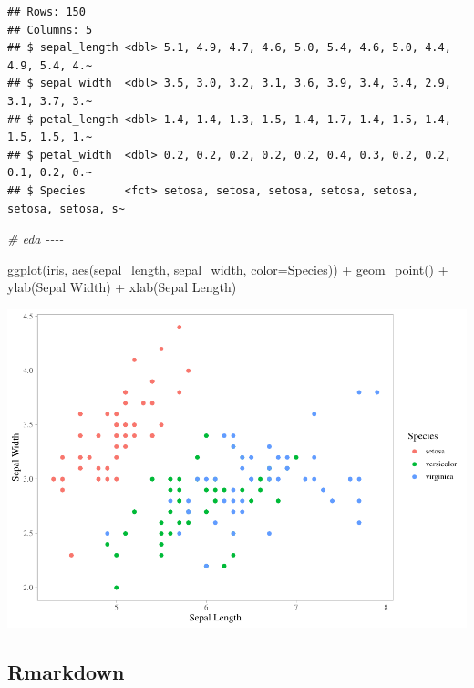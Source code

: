 \documentclass[
]{article}
\newenvironment{Shaded}{\begin{snugshade}}{\end{snugshade}}
\newcommand{\AttributeTok}[1]{\textcolor[rgb]{0.77,0.63,0.00}{#1}}
\newcommand{\CommentTok}[1]{\textcolor[rgb]{0.56,0.35,0.01}{\textit{#1}}}
\newcommand{\FunctionTok}[1]{\textcolor[rgb]{0.00,0.00,0.00}{#1}}
\newcommand{\NormalTok}[1]{#1}
\newcommand{\SpecialCharTok}[1]{\textcolor[rgb]{0.00,0.00,0.00}{#1}}
\newcommand{\StringTok}[1]{\textcolor[rgb]{0.31,0.60,0.02}{#1}}
\begin{document}
\begin{verbatim}
## Rows: 150
## Columns: 5
## $ sepal_length <dbl> 5.1, 4.9, 4.7, 4.6, 5.0, 5.4, 4.6, 5.0, 4.4, 4.9, 5.4, 4.~
## $ sepal_width  <dbl> 3.5, 3.0, 3.2, 3.1, 3.6, 3.9, 3.4, 3.4, 2.9, 3.1, 3.7, 3.~
## $ petal_length <dbl> 1.4, 1.4, 1.3, 1.5, 1.4, 1.7, 1.4, 1.5, 1.4, 1.5, 1.5, 1.~
## $ petal_width  <dbl> 0.2, 0.2, 0.2, 0.2, 0.2, 0.4, 0.3, 0.2, 0.2, 0.1, 0.2, 0.~
## $ Species      <fct> setosa, setosa, setosa, setosa, setosa, setosa, setosa, s~
\end{verbatim}

\begin{Shaded}
\begin{Highlighting}[]
\CommentTok{\# eda {-}{-}{-}{-}}

\FunctionTok{ggplot}\NormalTok{(iris, }\FunctionTok{aes}\NormalTok{(sepal\_length, sepal\_width, }\AttributeTok{color=}\NormalTok{Species)) }\SpecialCharTok{+} 
  \FunctionTok{geom\_point}\NormalTok{() }\SpecialCharTok{+}
    \FunctionTok{ylab}\NormalTok{(}\StringTok{\textquotesingle{}Sepal Width\textquotesingle{}}\NormalTok{) }\SpecialCharTok{+} 
  \FunctionTok{xlab}\NormalTok{(}\StringTok{\textquotesingle{}Sepal Length\textquotesingle{}}\NormalTok{)}
\end{Highlighting}
\end{Shaded}

\includegraphics{best_practices_files/figure-latex/unnamed-chunk-1-1.pdf}

\hypertarget{rmarkdown}{%
\subsection{Rmarkdown}\label{rmarkdown}}
\end{document}
